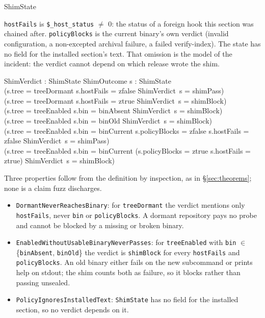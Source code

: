\documentclass[a4paper,10pt,fleqn]{article}
\newcommand{\field}[1]{\texttt{#1}}
\begin{document}
\begin{zed}
ShimState 
\end{zed}

\field{hostFails} is \field{\$\_host\_status} $\neq$ 0: the status of a
foreign hook this section was chained after. \field{policyBlocks} is the
current binary's own verdict (invalid configuration, a non-excepted
archival failure, a failed verify-index). The state has no field for the
installed section's text. That omission is the model of the incident:
the verdict cannot depend on which release wrote the shim.

\begin{axdef}
ShimVerdict : ShimState \fun ShimOutcome
\where
\forall s : ShimState \spot \\
\quad (s.tree = treeDormant \land s.hostFails = zfalse \implies
  ShimVerdict~s = shimPass) \land \\
\quad (s.tree = treeDormant \land s.hostFails = ztrue \implies
  ShimVerdict~s = shimBlock) \land \\
\quad (s.tree = treeEnabled \land s.bin = binAbsent \implies
  ShimVerdict~s = shimBlock) \land \\
\quad (s.tree = treeEnabled \land s.bin = binOld \implies
  ShimVerdict~s = shimBlock) \land \\
\quad (s.tree = treeEnabled \land s.bin = binCurrent \land
  s.policyBlocks = zfalse \land s.hostFails = zfalse \implies
  ShimVerdict~s = shimPass) \land \\
\quad (s.tree = treeEnabled \land s.bin = binCurrent \land
  (s.policyBlocks = ztrue \lor s.hostFails = ztrue) \implies
  ShimVerdict~s = shimBlock)
\end{axdef}

Three properties follow from the definition by inspection, as in
\S\ref{sec:theorems}; none is a claim fuzz discharges.

\begin{itemize}
  \item \field{DormantNeverReachesBinary}: for \field{treeDormant} the
    verdict mentions only \field{hostFails}, never \field{bin} or
    \field{policyBlocks}. A dormant repository pays no probe and cannot
    be blocked by a missing or broken binary.
  \item \field{EnabledWithoutUsableBinaryNeverPasses}: for
    \field{treeEnabled} with \field{bin} $\in$ \{\field{binAbsent},
    \field{binOld}\} the verdict is \field{shimBlock} for every
    \field{hostFails} and \field{policyBlocks}. An old binary
    either fails on the new subcommand or prints help on stdout; the shim
    counts both as failure, so it blocks rather than passing unsealed.
  \item \field{PolicyIgnoresInstalledText}: \field{ShimState} has no
    field for the installed section, so no verdict depends on it.
\end{itemize}
\end{document}
